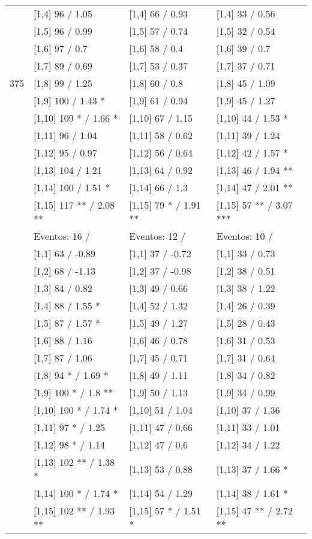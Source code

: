 \begin{table}
\begin{tabular}[t]{llll}
\addlinespace
 & {}[1,4] 96  / 1.05 & {}[1,4] 66  / 0.93 & {}[1,4] 33  / 0.56\\
 & {}[1,5] 96  / 0.99 & {}[1,5] 57  / 0.74 & {}[1,5] 32  / 0.54\\
 & {}[1,6] 97  / 0.7 & {}[1,6] 58  / 0.4 & {}[1,6] 39  / 0.7\\
 & {}[1,7] 89  / 0.69 & {}[1,7] 53  / 0.37 & {}[1,7] 37  / 0.71\\
375 & {}[1,8] 99  / 1.25 & {}[1,8] 60  / 0.8 & {}[1,8] 45  / 1.09\\
\addlinespace
 & {}[1,9] 100  / 1.43 * & {}[1,9] 61  / 0.94 & {}[1,9] 45  / 1.27\\
 & {}[1,10] 109 * / 1.66 * & {}[1,10] 67  / 1.15 & {}[1,10] 44  / 1.53 *\\
 & {}[1,11] 96  / 1.04 & {}[1,11] 58  / 0.62 & {}[1,11] 39  / 1.24\\
 & {}[1,12] 95  / 0.97 & {}[1,12] 56  / 0.64 & {}[1,12] 42  / 1.57 *\\
 & {}[1,13] 104  / 1.21 & {}[1,13] 64  / 0.92 & {}[1,13] 46  / 1.94 **\\
\addlinespace
 & {}[1,14] 100  / 1.51 * & {}[1,14] 66  / 1.3 & {}[1,14] 47  / 2.01 **\\
 & {}[1,15] 117 ** / 2.08 ** & {}[1,15] 79 * / 1.91 ** & {}[1,15] 57 ** / 3.07 ***\\
 & Eventos:  16 / & Eventos:  12 / & Eventos:  10 /\\
 & {}[1,1] 63  / -0.89 & {}[1,1] 37  / -0.72 & {}[1,1] 33  / 0.73\\
 & {}[1,2] 68  / -1.13 & {}[1,2] 37  / -0.98 & {}[1,2] 38  / 0.51\\
\addlinespace
 & {}[1,3] 84  / 0.82 & {}[1,3] 49  / 0.66 & {}[1,3] 38  / 1.22\\
 & {}[1,4] 88  / 1.55 * & {}[1,4] 52  / 1.32 & {}[1,4] 26  / 0.39\\
 & {}[1,5] 87  / 1.57 * & {}[1,5] 49  / 1.27 & {}[1,5] 28  / 0.43\\
 & {}[1,6] 88  / 1.16 & {}[1,6] 46  / 0.78 & {}[1,6] 31  / 0.53\\
 & {}[1,7] 87  / 1.06 & {}[1,7] 45  / 0.71 & {}[1,7] 31  / 0.64\\
\addlinespace
500 & {}[1,8] 94 * / 1.69 * & {}[1,8] 49  / 1.11 & {}[1,8] 34  / 0.82\\
 & {}[1,9] 100 * / 1.8 ** & {}[1,9] 50  / 1.13 & {}[1,9] 34  / 0.99\\
 & {}[1,10] 100 * / 1.74 * & {}[1,10] 51  / 1.04 & {}[1,10] 37  / 1.36\\
 & {}[1,11] 97 * / 1.25 & {}[1,11] 47  / 0.66 & {}[1,11] 33  / 1.01\\
 & {}[1,12] 98 * / 1.14 & {}[1,12] 47  / 0.6 & {}[1,12] 34  / 1.22\\
\addlinespace
 & {}[1,13] 102 ** / 1.38 * & {}[1,13] 53  / 0.88 & {}[1,13] 37  / 1.66 *\\
 & {}[1,14] 100 * / 1.74 * & {}[1,14] 54  / 1.29 & {}[1,14] 38  / 1.61 *\\
 & {}[1,15] 102 ** / 1.93 ** & {}[1,15] 57 * / 1.51 * & {}[1,15] 47 ** / 2.72 **\\
\bottomrule
\end{tabular}
\end{table}
